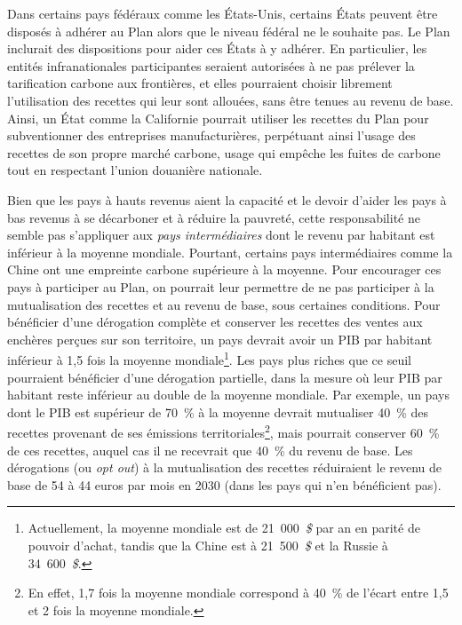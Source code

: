 \documentclass[a5paper,french,openany]{memoir}
\begin{document}
Dans certains pays fédéraux comme les États-Unis, certains États peuvent être disposés à adhérer au Plan alors que le niveau fédéral ne le souhaite pas. Le Plan inclurait des dispositions pour aider ces États à y adhérer. En particulier, les entités infranationales participantes seraient autorisées à ne pas prélever la tarification carbone aux frontières, et elles pourraient choisir librement l'utilisation des recettes qui leur sont allouées, sans être tenues au revenu de base. 
Ainsi, un État comme la Californie pourrait utiliser les recettes du Plan pour subventionner des entreprises manufacturières, perpétuant ainsi l'usage des recettes de son propre marché carbone, usage qui empêche les fuites de carbone tout en respectant l'union douanière nationale.

Bien que les pays à hauts revenus aient la capacité et le devoir d'aider les pays à bas revenus à se décarboner et à réduire la pauvreté, cette responsabilité ne semble pas s'appliquer aux \textit{pays intermédiaires} dont le revenu par habitant est inférieur à la moyenne mondiale. Pourtant, certains pays intermédiaires comme la Chine ont une empreinte carbone supérieure à la moyenne. Pour encourager ces pays à participer au Plan, on pourrait leur permettre de ne pas participer à la mutualisation des recettes et au revenu de base, sous certaines conditions. Pour bénéficier d'une dérogation complète et conserver les recettes des ventes aux enchères perçues sur son territoire, un pays devrait avoir un PIB par habitant inférieur à 1,5 fois la moyenne mondiale\footnote{Actuellement, la moyenne mondiale est de 21~000~\textit{\$} par an en parité de pouvoir d'achat, tandis que la Chine est à 21~500~\textit{\$} et la Russie à 34~600~\textit{\$}.}. 
Les pays plus riches que ce seuil pourraient bénéficier d'une dérogation partielle, dans la mesure où leur PIB par habitant reste inférieur au double de la moyenne mondiale. Par exemple, un pays dont le PIB est supérieur de 70~\% à la moyenne devrait mutualiser 40~\% des recettes provenant de ses émissions territoriales\footnote{En effet, 1,7 fois la moyenne mondiale correspond à 40~\% de l'écart entre 1,5 et 2 fois la moyenne mondiale.}, mais pourrait conserver 60~\% de ces recettes, auquel cas il ne recevrait que 40~\% du revenu de base. Les dérogations (ou \textit{opt out}) à la mutualisation des recettes réduiraient le revenu de base de 54 à 44 euros par mois en 2030 (dans les pays qui n'en bénéficient pas). 
\end{document}
